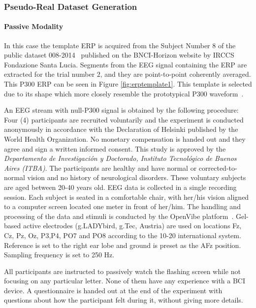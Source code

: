 \documentclass[brainsci,article,submit,moreauthors,pdftex,10pt,a4paper]{mdpi}
\begin{document}
\subsubsection{Pseudo-Real Dataset Generation}

\paragraph{Passive Modality}

In this case the template ERP is acquired from the Subject Number $8$ of the public dataset 008-2014~\citep{Riccio2013} published on the BNCI-Horizon website \citep{Brunner2014} by IRCCS Fondazione Santa Lucia. Segments from the EEG signal containing the ERP are extracted for the trial number $2$, and they are point-to-point coherently averaged.  This P300 ERP can be seen in Figure  \ref{fig:erptemplate1}.  This template is selected due to its shape which more closely resemble the prototypical P300 waveform~\citep{Rao2013,Clerc2016}.

An EEG stream with null-P300 signal is obtained by the following procedure: 
Four (4) participants are recruited voluntarily and the experiment is conducted anonymously in accordance with the Declaration of Helsinki published by the World Health Organization.  No monetary compensation is handed out and they agree and sign a written informed consent.  This study is approved by the \textit{Departamento de Investigación y Doctorado, Instituto Tecnológico de Buenos Aires (ITBA)}.  The participants are healthy and have normal or corrected-to-normal vision and no history of neurological disorders. These voluntary subjects are aged between 20-40 years old.  EEG data is collected in a single recording session. Each subject is seated in a comfortable chair, with her/his vision aligned to a computer screen located one meter in front of her/him.  The handling and processing of the data and stimuli is conducted by the OpenVibe platform~\citep{Renard2010}.  Gel-based active electrodes (g.LADYbird, g.Tec, Austria) are used on locations Fz, Cz, Pz, Oz, P3,P4, PO7 and PO8 according to the 10-20 international system.  Reference is set to the right ear lobe and ground is preset as the AFz position.   Sampling frequency is set to 250 Hz.

All participants are instructed to passively watch the flashing screen while not focusing on any particular letter.  None of them have any experience with a BCI device.  A questionnaire is handed out at the end of the experiment with questions about how the participant felt during it, without giving more details.  
\end{document}
